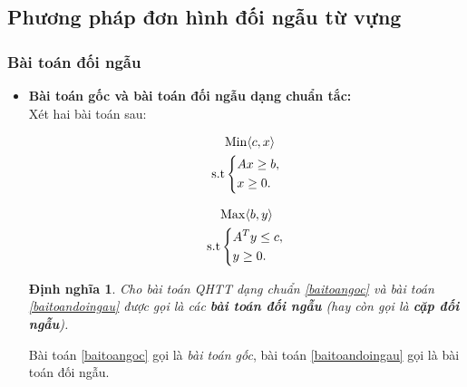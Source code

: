 \documentclass[12pt,a4paper]{report}
\newtheorem{dn}{Định nghĩa}
\begin{document}
\subsection{Phương pháp đơn hình đối ngẫu từ vựng}
\subsubsection{ Bài toán đối ngẫu }
\begin{itemize}
    \item \textbf{Bài toán gốc và bài toán đối ngẫu dạng chuẩn tắc:}\\
    Xét hai bài toán sau:\\
    \begin{minipage}[t]{0.48\linewidth}
   \begin{equation}\label{baitoangoc}
     \begin{split}
          & {\rm{Min}} \langle c,x \rangle\\
          \rm{s.t} &\left\{\begin{split}
            & Ax\ge b,\\
            & x \ge 0.\\
           \end{split}\right.
       \end{split}
   \end{equation}
\end{minipage}\hfill
\begin{minipage}[t]{0.48\linewidth}
\begin{equation}\label{baitoandoingau}
    \begin{split}
        & {\rm{Max}} \langle b,y \rangle\\
       \rm{s.t} & \left\{\begin{split}
            &A^Ty \le c,\\
            & y\ge 0.\\
        \end{split}\right.
    \end{split}
\end{equation}
\end{minipage}
\begin{dn}
    Cho bài toán QHTT dạng chuẩn \eqref{baitoangoc} và bài toán \eqref{baitoandoingau} được gọi là các \textbf{bài toán đối ngẫu } (hay còn gọi là \textbf{cặp đối ngẫu}).\\
\end{dn}
Bài toán \eqref{baitoangoc} gọi là \textit{bài toán gốc}, bài toán \eqref{baitoandoingau} gọi là bài toán đối ngẫu.\\

\end{itemize}
\end{document}
